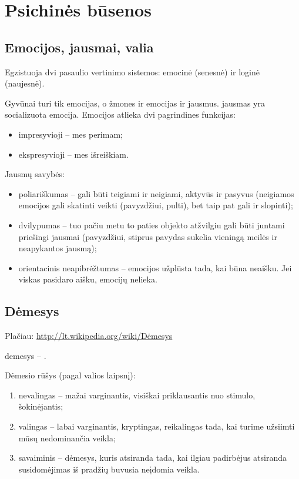 \chapter{Psichinės būsenos}

\label{tema:psichines_busenos}

\section{Emocijos, jausmai, valia}

Egzistuoja dvi pasaulio vertinimo sistemos: emocinė (senesnė) ir loginė 
(naujesnė). 

Gyvūnai turi tik emocijas, o žmones ir emocijas ir jausmus. \Gls{jausmas} 
yra socializuota \gls{emocija}. Emocijos atlieka dvi pagrindines funkcijas:

\begin{itemize}
  \item impresyvioji – mes perimam;
  \item ekspresyvioji – mes išreiškiam.
\end{itemize}

Jausmų savybės:

\begin{itemize}
  \item poliariškumas – gali būti teigiami ir neigiami, aktyvūs ir pasyvus
    (neigiamos emocijos gali skatinti veikti (pavyzdžiui, pulti), bet taip 
    pat gali ir slopinti);
  \item dvilypumas – tuo pačiu metu to paties objekto atžvilgiu gali būti
    juntami priešingi jausmai (pavyzdžiui, stiprus pavydas sukelia 
    vieningą meilės ir neapykantos jausmą);
  \item orientacinis neapibrėžtumas – emocijos užplūsta tada, kai būna
    neaišku. Jei viskas pasidaro aišku, emocijų nelieka.
\end{itemize}

\section{Dėmesys}

\label{tema:demesys}

Plačiau: \url{http://lt.wikipedia.org/wiki/Dėmesys}

\Gls{demesys} – .

Dėmesio rūšys (pagal valios laipsnį):

\begin{enumerate}
  \item nevalingas – mažai varginantis, visiškai priklausantis nuo stimulo, 
    šokinėjantis;
  \item valingas – labai varginantis, kryptingas, reikalingas tada, kai 
    turime užsiimti mūsų nedominančia veikla;
  \item savaiminis – dėmesys, kuris atsiranda tada, kai ilgiau padirbėjus
    atsiranda susidomėjimas iš pradžių buvusia neįdomia veikla.
\end{enumerate}

